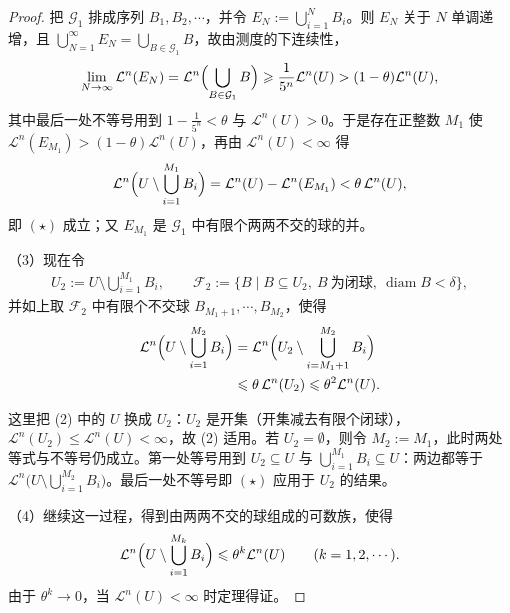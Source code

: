 \documentclass[../../main.tex]{subfiles}%
\begin{document}
\begin{proof}
把 $\mathcal{G}_1$ 排成序列 $B_1,B_2,\cdots$，并令 $E_N:=\bigcup_{i=1}^{N}B_i$。则 $E_N$ 关于 $N$ 单调递增，且 $\bigcup_{N=1}^{\infty}E_N=\bigcup_{B\in\mathcal{G}_1}B$，故由测度的下连续性，
\begin{align*}
\lim_{N\to\infty}\mathcal{L}^n(E_N)=\mathcal{L}^n\Bigl(\bigcup_{B\in\mathcal{G}_1}B\Bigr)\geqslant\frac{1}{5^n}\mathcal{L}^n(U)>(1-\theta)\mathcal{L}^n(U),
\end{align*}
其中最后一处不等号用到 $1-\frac{1}{5^n}<\theta$ 与 $\mathcal{L}^n(U)>0$。于是存在正整数 $M_1$ 使 $\mathcal{L}^n(E_{M_1})>(1-\theta)\mathcal{L}^n(U)$，再由 $\mathcal{L}^n(U)<\infty$ 得
\begin{align*}
\mathcal{L}^n\Bigl(U\setminus\bigcup_{i=1}^{M_1}B_i\Bigr)=\mathcal{L}^n(U)-\mathcal{L}^n(E_{M_1})<\theta\,\mathcal{L}^n(U),
\end{align*}
即 $(\star)$ 成立；又 $E_{M_1}$ 是 $\mathcal{G}_1$ 中有限个两两不交的球的并。

（3）现在令
\begin{align*}
U_2:=U\setminus\bigcup_{i=1}^{M_1}B_i,\qquad
\mathcal{F}_2:=\{B\mid B\subseteq U_2,\ B\ \text{为闭球},\ \operatorname{diam}B<\delta\},
\end{align*}
并如上取 $\mathcal{F}_2$ 中有限个不交球 $B_{M_1+1},\cdots,B_{M_2}$，使得
\begin{align*}
\mathcal{L}^n\Bigl(U\setminus\bigcup_{i=1}^{M_2}B_i\Bigr)
&=\mathcal{L}^n\Bigl(U_2\setminus\bigcup_{i=M_1+1}^{M_2}B_i\Bigr)\\
&\leqslant\theta\,\mathcal{L}^n(U_2)\leqslant\theta^2\mathcal{L}^n(U).
\end{align*}

这里把 (2) 中的 $U$ 换成 $U_2$：$U_2$ 是开集（开集减去有限个闭球），$\mathcal{L}^n(U_2)\leqslant\mathcal{L}^n(U)<\infty$，故 (2) 适用。若 $U_2=\emptyset$，则令 $M_2:=M_1$，此时两处等式与不等号仍成立。第一处等号用到 $U_2\subseteq U$ 与 $\bigcup_{i=1}^{M_1}B_i\subseteq U$：两边都等于 $\mathcal{L}^n\bigl(U\setminus\bigcup_{i=1}^{M_2}B_i\bigr)$。最后一处不等号即 $(\star)$ 应用于 $U_2$ 的结果。

（4）继续这一过程，得到由两两不交的球组成的可数族，使得
\begin{align*}
\mathcal{L}^n\Bigl(U\setminus\bigcup_{i=1}^{M_k}B_i\Bigr)\leqslant\theta^k\mathcal{L}^n(U)\qquad(k=1,2,\cdots).
\end{align*}
由于 $\theta^k\to0$，当 $\mathcal{L}^n(U)<\infty$ 时定理得证。


\end{proof}
\end{document}
